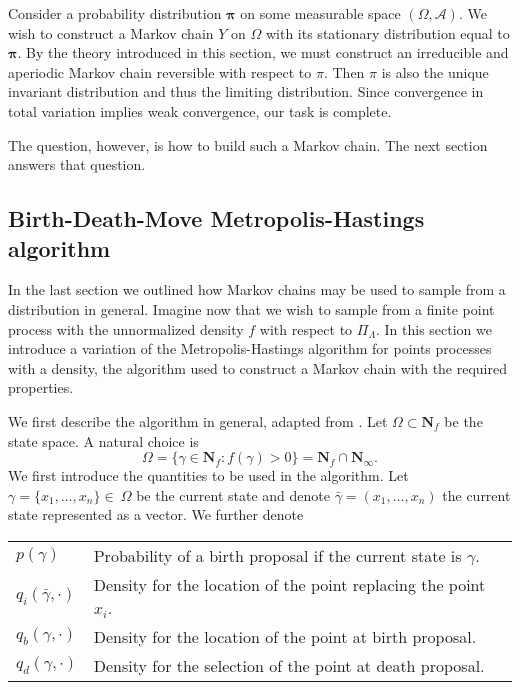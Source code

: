 Consider a probability distribution $\mathbf \pi$ on some measurable space $(\Omega,\mathcal A)$. We wish to construct a Markov chain $Y$ on $\Omega$ with its stationary distribution equal to $\mathbf \pi$. By the theory introduced in this section, we must construct an irreducible and aperiodic Markov chain reversible with respect to $\pi$. Then $\pi$ is also the unique invariant distribution and thus 
the limiting distribution. Since convergence in total variation implies weak convergence, our task is complete.

The question, however, is how to build such a Markov chain. The next section answers that question. 



\subsection{Birth-Death-Move Metropolis-Hastings algorithm}
In the last section we outlined how Markov chains may be used to sample from a distribution in general. Imagine now that we wish to sample from a finite point process with the unnormalized density $f$ with respect to $\Pi_\Lambda$. In this section we introduce a variation of the Metropolis-Hastings algorithm for points processes with a density, the algorithm used to construct a Markov chain with the required properties. 

We first describe the algorithm in general, adapted from \cite{MollerWaagepetersen2003}.  \newline
\noindent Let $\Omega\subset \mathbf N_f$ be the state space. A natural choice is 
$$\Omega=\{\gamma \in \mathbf N_f: f(\gamma)>0 \} = \mathbf N_f \cap \mathbf N_\infty.$$
We first introduce the quantities to be used in the algorithm. Let $\gamma = \{x_1,\dots, x_n\} \in ~\Omega$ be the current state and denote $\bar\gamma = (x_1,\dots, x_n)$ the current state represented as a vector. We further denote 

\begin{tabular}{ll}
$p(\gamma)$ & Probability of a birth proposal if the current state is $\gamma$.  \\
$q_i(\bar\gamma,\cdot)$ & Density for the location of the point replacing the point $x_i$. \\
$q_b(\gamma,\cdot)$ & Density for the location of the point at birth proposal. \\
$q_d(\gamma,\cdot)$ & Density for the selection of the point at death proposal. 
\end{tabular}

